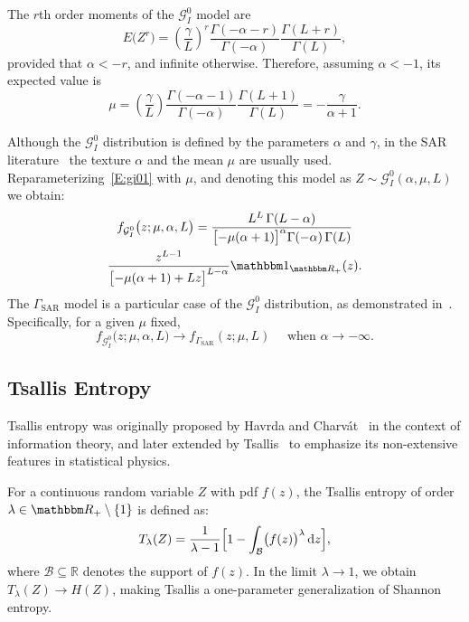\documentclass[
  lettersize  journal,
]{IEEEtran}%
\begin{document}
The \(r\)th order moments of the \(\mathcal{G}_I^0\) model are
\begin{equation}
E\big(Z^r\big)  = \left(\frac{\gamma}{L}\right)^r\frac{\Gamma(-\alpha-r)}{\Gamma(-\alpha)}\frac{\Gamma(L+r)}{\Gamma(L)}, 
    \label{E:rmom}
\end{equation} provided that \(\alpha <-r\), and infinite otherwise.
Therefore, assuming \(\alpha<-1\), its expected value is
\begin{equation}
    \mu=\left(\frac{\gamma}{L}\right)\frac{\Gamma(-\alpha-1)}{\Gamma(-\alpha)}\frac{\Gamma(L+1)}{\Gamma(L)}=-\frac{\gamma}{\alpha+1}.
    \label{E:mean1}
\end{equation}

Although the \(\mathcal{G}_I^0\) distribution is defined by the
parameters \(\alpha\) and \(\gamma\), in the SAR
literature~ the texture
\(\alpha\) and the mean \(\mu\) are usually used.
Reparameterizing~\eqref{E:gi01} with \(\mu\), and denoting this model as
\(Z \sim \mathcal{G}_I^0(\alpha, \mu, L)\) we obtain: \begin{multline}
    f_{\mathcal{G}^0_I}\bigl(z; \mu, \alpha, L \bigr) 
    = \frac{L^L\,\Gamma(L-\alpha)}
    {\bigl[-\mu(\alpha+1)\bigr]^{\alpha} \Gamma(-\alpha)\,\Gamma(L)}\\
    \frac{z^{L-1}}
    {\bigl[-\mu(\alpha+1)+Lz\bigr]^{L-\alpha}}
    \mathbbm 1_{\mathbbm R_+}(z). \label{E:gi02}
\end{multline} The \(\Gamma_{\mathrm{SAR}}\) model is a particular case
of the \(\mathcal{G}^0_I\) distribution, as demonstrated
in~. Specifically, for a given \(\mu\)
fixed, \[
f_{\mathcal{G}^0_I}\big(z; \mu, \alpha, L\big)
\longrightarrow 
f_{\Gamma_{\text{SAR}}}(z;\mu, L) \quad \text{ when } \alpha\to-\infty.
\]

\subsection{Tsallis Entropy}\label{tsallis-entropy}

Tsallis entropy was originally proposed by Havrda and
Charvát~ in the context of
information theory, and later extended by
Tsallis~ to emphasize its
non-extensive features in statistical physics.

For a continuous random variable \(Z\) with pdf \(f(z)\), the Tsallis
entropy of order \(\lambda \in \mathbbm R_+ \setminus \{1\}\) is defined
as: \begin{equation}
\label{eq:tsallis}
T_\lambda(Z) = \frac{1}{\lambda - 1} \Bigl[ 1 - \int_{\mathcal{B}} \bigl(f(z)\bigr)^{\lambda} \,\mathrm{d}z \Bigr],
\end{equation} where \(\mathcal{B} \subseteq \mathbb{R}\) denotes the
support of \(f(z)\). In the limit \(\lambda \to 1\), we obtain
\(T_\lambda(Z) \to H(Z)\), making Tsallis a one-parameter generalization
of Shannon entropy.
\end{document}
